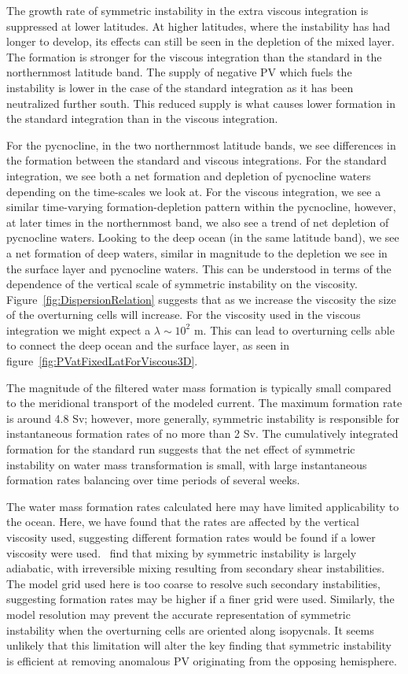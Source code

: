     The growth rate of symmetric instability in the extra viscous integration is suppressed at lower latitudes. At higher latitudes, where the instability has had longer to develop, its effects can still be seen in the depletion of the mixed layer. The formation is stronger for the viscous integration than the standard in the northernmost latitude band. The supply of negative PV which fuels the instability is lower in the case of the standard integration as it has been neutralized further south. This reduced supply is what causes lower formation in the standard integration than in the viscous integration.
    
    For the pycnocline, in the two northernmost latitude bands, we see differences in the formation between the standard and viscous integrations. For the standard integration, we see both a net formation and depletion of pycnocline waters depending on the time-scales we look at. For the viscous integration, we see a similar time-varying formation-depletion pattern within the pycnocline, however, at later times in the northernmost band, we also see a trend of net depletion of pycnocline waters. Looking to the deep ocean (in the same latitude band), we see a net formation of deep waters, similar in magnitude to the depletion we see in the surface layer and pycnocline waters. This can be understood in terms of the dependence of the vertical scale of symmetric instability on the viscosity. Figure~\ref{fig:DispersionRelation} suggests that as we increase the viscosity the size of the overturning cells will increase. For the viscosity used in the viscous integration we might expect a $\lambda \sim 10^2$ m. This can lead to overturning cells able to connect the deep ocean and the surface layer, as seen in figure~\ref{fig:PVatFixedLatForViscous3D}.

    The magnitude of the filtered water mass formation is typically small compared to the meridional transport of the modeled current. The maximum formation rate is around 4.8 Sv; however, more generally, symmetric instability is responsible for instantaneous formation rates of no more than 2 Sv. The cumulatively integrated formation for the standard run suggests that the net effect of symmetric instability on water mass transformation is small, with large instantaneous formation rates balancing over time periods of several weeks.
    
    The water mass formation rates calculated here may have limited applicability to the ocean. Here, we have found that the rates are affected by the vertical viscosity used, suggesting different formation rates would be found if a lower viscosity were used.~\citet{Yankovsky2019} find that mixing by symmetric instability is largely adiabatic, with irreversible mixing resulting from secondary shear instabilities. The model grid used here is too coarse to resolve such secondary instabilities, suggesting formation rates may be higher if a finer grid were used. Similarly, the model resolution may prevent the accurate representation of symmetric instability when the overturning cells are oriented along isopycnals. It seems unlikely that this limitation will alter the key finding that symmetric instability is efficient at removing anomalous PV originating from the opposing hemisphere.
